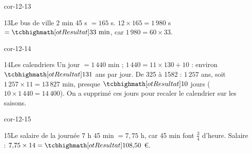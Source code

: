 \begin{blocLivre}{cor-12-13}\begin{corrige}{13}{Le bus de ville}
2 min 45 s $=165$ s. $12\times165=1\,980$ s $=\res{33\text{ min}}$, car $1\,980=60\times33$.
\end{corrige}\end{blocLivre}
\begin{blocLivre}{cor-12-14}\begin{corrige}{14}{Les calendriers}
Un jour $=1\,440$ min ; $1\,440=11\times130+10$ : environ $\res{131}$ ans par jour. De 325 à 1582 : $1\,257$ ans, soit $1\,257\times11=13\,827$ min, presque $\res{10}$ jours ($10\times1\,440=14\,400$). On a supprimé ces jours pour recaler le calendrier sur les saisons.
\end{corrige}\end{blocLivre}
\begin{blocLivre}{cor-12-15}\begin{corrige}{15}{Le salaire de la journée}
7 h 45 min $=7{,}75$ h, car 45 min font $\frac34$ d’heure. Salaire : $7{,}75\times14=\res{108{,}50}$ €.
\end{corrige}\end{blocLivre}
